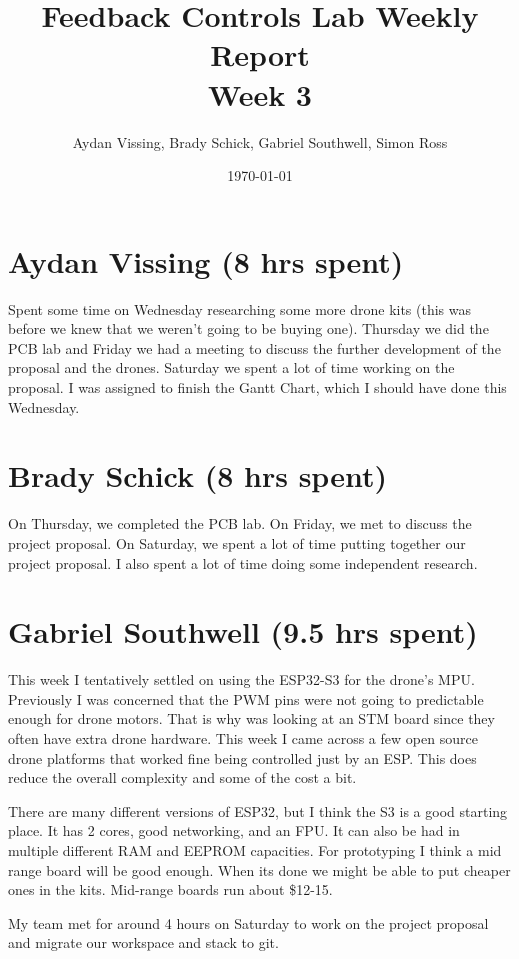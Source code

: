 \documentclass[12pt, titlepage]{article}
\title{Feedback Controls Lab Weekly Report \\ \normalsize{Week 3}}
\author{Aydan Vissing, Brady Schick, Gabriel Southwell, Simon Ross}
\date{\today}
\begin{document}
\maketitle

\section*{Aydan Vissing (8 hrs spent)}

Spent some time on Wednesday researching some more drone kits (this was before we knew that we weren’t going to be buying one). Thursday we did the PCB lab and Friday we had a meeting to discuss the further development of the proposal and the drones. Saturday we spent a lot of time working on the proposal. I was assigned to finish the Gantt Chart, which I should have done this Wednesday. 

\section*{Brady Schick (8 hrs spent)}

On Thursday, we completed the PCB lab. On Friday, we met to discuss the project proposal. On Saturday, we spent a lot of time putting together our project proposal. I also spent a lot of time doing some independent research.

\section*{Gabriel Southwell (9.5 hrs spent)}

This week I tentatively settled on using the ESP32-S3 for the drone’s MPU. Previously I was concerned that the PWM pins were not going to predictable enough for drone motors. That is why was looking at an STM board since they often have extra drone hardware. This week I came across a few open source drone platforms that worked fine being controlled just by an ESP. This does reduce the overall complexity and some of the cost a bit.

There are many different versions of ESP32, but I think the S3 is a good starting place. It has 2 cores, good networking, and an FPU. It can also be had in multiple different RAM and EEPROM capacities. For prototyping I think a mid range board will be good enough. When its done we might be able to put cheaper ones in the kits. Mid-range boards run about \$12-15.

My team met for around 4 hours on Saturday to work on the project proposal and migrate our workspace and stack to git.
	
\end{document}
